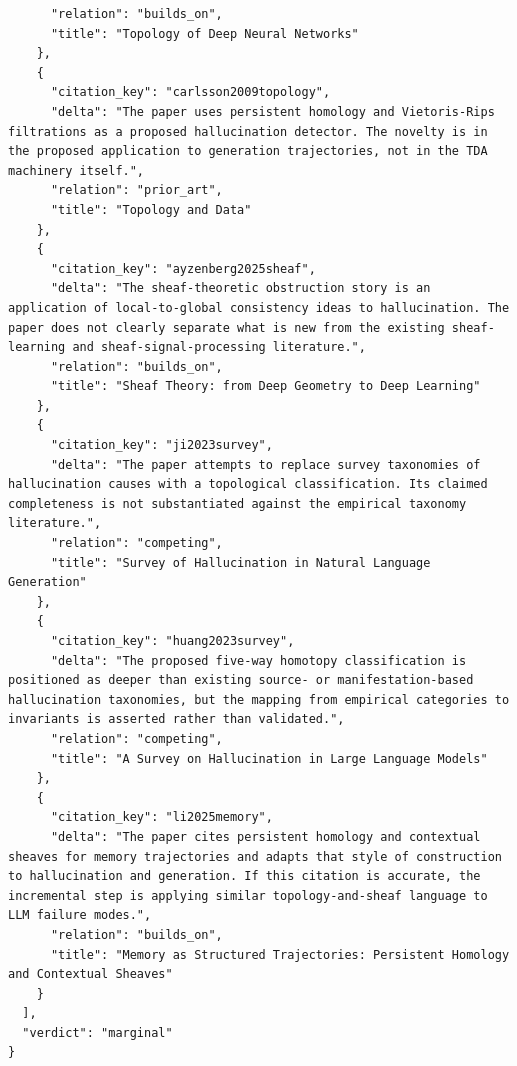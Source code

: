 \documentclass[11pt]{article}
\begin{document}
\begin{verbatim}
      "relation": "builds_on",
      "title": "Topology of Deep Neural Networks"
    },
    {
      "citation_key": "carlsson2009topology",
      "delta": "The paper uses persistent homology and Vietoris-Rips filtrations as a proposed hallucination detector. The novelty is in the proposed application to generation trajectories, not in the TDA machinery itself.",
      "relation": "prior_art",
      "title": "Topology and Data"
    },
    {
      "citation_key": "ayzenberg2025sheaf",
      "delta": "The sheaf-theoretic obstruction story is an application of local-to-global consistency ideas to hallucination. The paper does not clearly separate what is new from the existing sheaf-learning and sheaf-signal-processing literature.",
      "relation": "builds_on",
      "title": "Sheaf Theory: from Deep Geometry to Deep Learning"
    },
    {
      "citation_key": "ji2023survey",
      "delta": "The paper attempts to replace survey taxonomies of hallucination causes with a topological classification. Its claimed completeness is not substantiated against the empirical taxonomy literature.",
      "relation": "competing",
      "title": "Survey of Hallucination in Natural Language Generation"
    },
    {
      "citation_key": "huang2023survey",
      "delta": "The proposed five-way homotopy classification is positioned as deeper than existing source- or manifestation-based hallucination taxonomies, but the mapping from empirical categories to invariants is asserted rather than validated.",
      "relation": "competing",
      "title": "A Survey on Hallucination in Large Language Models"
    },
    {
      "citation_key": "li2025memory",
      "delta": "The paper cites persistent homology and contextual sheaves for memory trajectories and adapts that style of construction to hallucination and generation. If this citation is accurate, the incremental step is applying similar topology-and-sheaf language to LLM failure modes.",
      "relation": "builds_on",
      "title": "Memory as Structured Trajectories: Persistent Homology and Contextual Sheaves"
    }
  ],
  "verdict": "marginal"
}
\end{verbatim}
\end{document}
